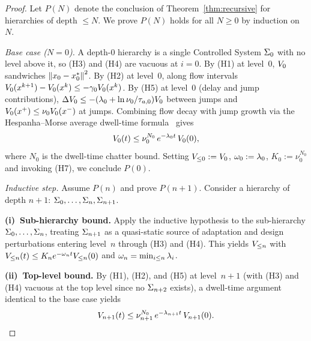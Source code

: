 \documentclass[11pt,a4paper]{article}
\begin{document}
\begin{proof}
Let $P(N)$ denote the conclusion of Theorem~\ref{thm:recursive} for
hierarchies of depth $\leq N$.  We prove $P(N)$ holds for all
$N \geq 0$ by induction on~$N$.

\emph{Base case ($N = 0$).}  A depth-$0$ hierarchy is a single
Controlled System $\Sigma_0$ with no level above it, so (H3) and (H4)
are vacuous at $i = 0$.  By (H1) at level~$0$, $V_{0}$ sandwiches
$\left\| x_0 - x^*_{0} \right\|^2$.  By (H2) at level~$0$, along flow
intervals
$V_{0}(x^{k+1}) - V_{0}(x^k) \leq -\gamma_0 V_{0}(x^k)$.
By (H5) at level~$0$ (delay and jump contributions),
$\Delta \lyap{0} \leq -(\stab_0 + \ln\nu_0/\taua[0]) \lyap{0}$ between
jumps and $V_{0}(x^+) \leq \nu_0 V_{0}(x^-)$ at jumps.  Combining
flow decay with jump growth via the Hespanha--Morse average
dwell-time formula~\cite{hespanha1999stability} gives
\begin{equation}
  V_{0}(t)
  \leq \nu_0^{N_0} \, e^{-\lambda_0 t} \, V_{0}(0),
  \label{eq:base-decay}
\end{equation}
where $N_0$ is the dwell-time chatter bound.  Setting
$V_{\leq 0} := V_{0}$, $\omega_0 := \lambda_0$,
$K_0 := \nu_0^{N_0}$ and invoking (H7), we conclude $P(0)$.

\emph{Inductive step.}  Assume $P(n)$ and prove $P(n+1)$.  Consider a
hierarchy of depth $n + 1$: $\Sigma_0, \ldots, \Sigma_n, \Sigma_{n+1}$.

\smallskip
\noindent\textbf{(i)~Sub-hierarchy bound.}  Apply the inductive
hypothesis to the sub-hierarchy $\Sigma_0, \ldots, \Sigma_n$, treating
$\Sigma_{n+1}$ as a quasi-static source of adaptation and design
perturbations entering level~$n$ through (H3) and (H4).  This yields
$V_{\leq n}$ with
$V_{\leq n}(t) \leq K_n e^{-\omega_n t} V_{\leq n}(0)$ and
$\omega_n = \min_{i \leq n} \lambda_i$.

\smallskip
\noindent\textbf{(ii)~Top-level bound.}  By (H1), (H2), and (H5) at
level~$n+1$ (with (H3) and (H4) vacuous at the top level since no
$\Sigma_{n+2}$ exists), a dwell-time argument identical to the base case
yields
\begin{equation}
  V_{n+1}(t)
  \leq \nu_{n+1}^{N_0}\, e^{-\lambda_{n+1} t}\, V_{n+1}(0).
  \label{eq:top-decay}
\end{equation}


\end{proof}
\end{document}
